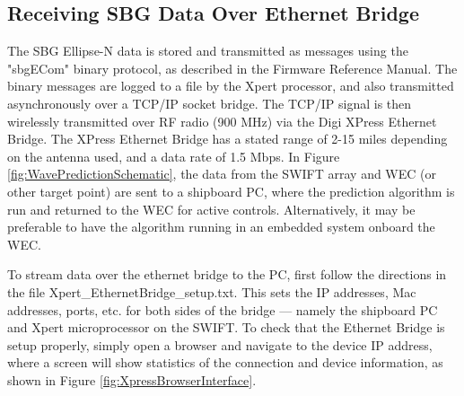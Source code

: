 \documentclass[11pt]{amsart}
\begin{document}
\subsection{Receiving SBG Data Over Ethernet Bridge}
The SBG Ellipse-N data is stored and transmitted as messages using the "sbgECom" binary protocol, as described in the Firmware Reference Manual.  The binary messages are logged to a file by the Xpert processor, and also transmitted asynchronously over a TCP/IP socket bridge.  The TCP/IP signal is then wirelessly transmitted over RF radio (900 MHz) via the Digi XPress Ethernet Bridge.  The XPress Ethernet Bridge has a stated range of 2-15 miles depending on the antenna used, and a data rate of 1.5 Mbps.  In Figure \ref{fig:WavePredictionSchematic}, the data from the SWIFT array and WEC (or other target point) are sent to a shipboard PC, where the prediction algorithm is run and returned to the WEC for active controls.  Alternatively, it may be preferable to have the algorithm running in an embedded system onboard the WEC.  

To stream data over the ethernet bridge to the PC, first follow the directions in the file Xpert\_EthernetBridge\_setup.txt.  This sets the IP addresses, Mac addresses, ports, etc. for both sides of the bridge --- namely the shipboard PC and Xpert microprocessor on the SWIFT.  To check that the Ethernet Bridge is setup properly, simply open a browser and navigate to the device IP address, where a screen will show statistics of the connection and device information, as shown in Figure \ref{fig:XpressBrowserInterface}.
\end{document}
